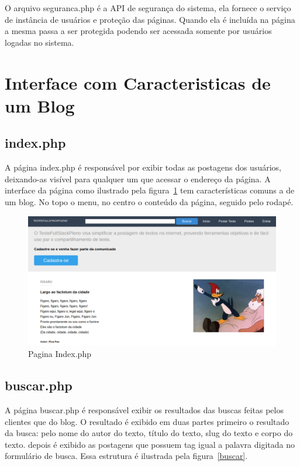 \documentclass[
	article,			%
	11pt,				%
	oneside,			%
	a4paper,			%
	english,			%
	brazil,				%
	sumario=tradicional
	]{abntex2}
\begin{document}
O arquivo seguranca.php é a API de segurança do sistema, ela fornece o serviço de instância de usuários e proteção das páginas.  Quando ela é incluída na página a mesma passa a ser protegida podendo ser acessada somente por usuários logadas no sistema. 

\section{Interface com Caracteristicas de um Blog}

\subsection{index.php}

A página index.php é responsável por exibir todas as postagens dos usuários, deixando-as visível para qualquer um que acessar o endereço da página.  A interface da página como ilustrado pela figura~\ref{index}  tem  características comuns a de um blog. No topo o menu, no centro o conteúdo da página, seguido pelo rodapé. 

\begin{figure} [h!]
  \centering
    \caption{Pagina Index.php}
  \label{index}
    \includegraphics[scale=0.3]{index.png}
       
\end{figure} 


\subsection{buscar.php}

A página buscar.php é responsável exibir os resultados das buscas feitas pelos clientes que do blog.  O resultado é exibido em duas partes primeiro o resultado da busca: pelo nome do autor do texto, título do texto,  slug do texto e corpo do texto. depois é exibido as postagens que possuem tag igual a palavra digitada no formulário de busca.  Essa estrutura é ilustrada pela figura~\ref{buscar}.  
\end{document}
